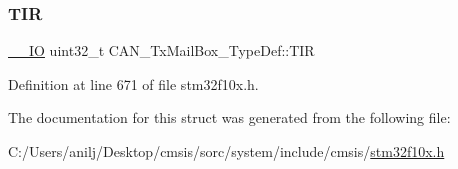 \subsubsection{\texorpdfstring{T\+IR}{TIR}}
{\footnotesize\ttfamily \hyperlink{core__sc300_8h_aec43007d9998a0a0e01faede4133d6be}{\+\_\+\+\_\+\+IO} uint32\+\_\+t C\+A\+N\+\_\+\+Tx\+Mail\+Box\+\_\+\+Type\+Def\+::\+T\+IR}



Definition at line 671 of file stm32f10x.\+h.



The documentation for this struct was generated from the following file\+:\begin{DoxyCompactItemize}
\item 
C\+:/\+Users/anilj/\+Desktop/cmsis/sorc/system/include/cmsis/\hyperlink{stm32f10x_8h}{stm32f10x.\+h}\end{DoxyCompactItemize}
